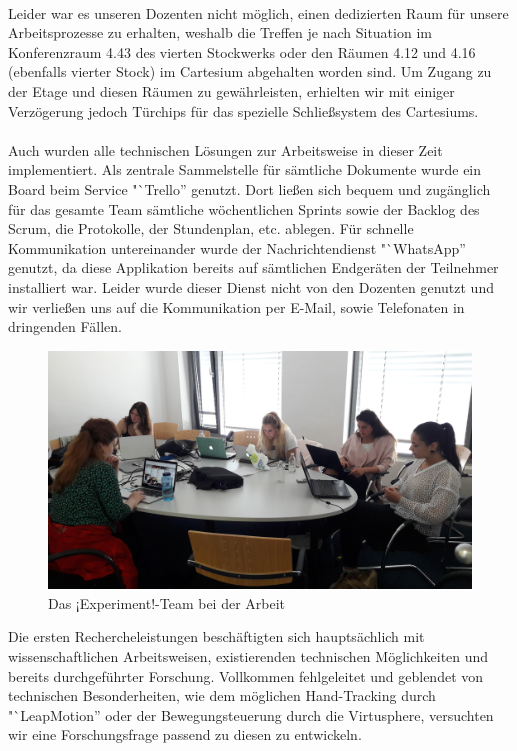 \documentclass{Bericht}
\begin{document}
\\
		Leider war es unseren Dozenten nicht möglich, einen dedizierten Raum für unsere Arbeitsprozesse zu erhalten, weshalb die Treffen je nach Situation im Konferenzraum 4.43 des vierten Stockwerks oder den Räumen 4.12 und 4.16 (ebenfalls vierter Stock) im Cartesium abgehalten worden sind. Um Zugang zu der Etage und diesen Räumen zu gewährleisten, erhielten wir mit einiger Verzögerung jedoch Türchips für das spezielle Schließsystem des Cartesiums.\\
\\
\newpage
		Auch wurden alle technischen Lösungen zur Arbeitsweise in dieser Zeit implementiert. Als zentrale Sammelstelle für sämtliche Dokumente wurde ein Board beim Service "`Trello'' genutzt. Dort ließen sich bequem und zugänglich für das gesamte Team sämtliche wöchentlichen Sprints sowie der Backlog des Scrum, die Protokolle, der Stundenplan, etc. ablegen. Für schnelle Kommunikation untereinander wurde der Nachrichtendienst "`WhatsApp'' genutzt, da diese Applikation bereits auf sämtlichen Endgeräten der Teilnehmer installiert war. Leider wurde dieser Dienst nicht von den Dozenten genutzt und wir verließen uns auf die Kommunikation per E-Mail, sowie Telefonaten in dringenden Fällen.\\
		\begin{figure}[H] %
			\centering
			\includegraphics[width=\linewidth, height=\textheight, keepaspectratio]{../Bilder/20170518_103125.jpg}
			\caption{Das ¡Experiment!-Team bei der Arbeit}
			\label{img:experiment-team-bei-der-arbeit}
		\end{figure}
		Die ersten Rechercheleistungen beschäftigten sich hauptsächlich mit wissenschaftlichen Arbeitsweisen, existierenden technischen Möglichkeiten und bereits durchgeführter Forschung. Vollkommen fehlgeleitet und geblendet von technischen Besonderheiten, wie dem möglichen Hand-Tracking durch "`LeapMotion'' oder der Bewegungsteuerung durch die Virtusphere, versuchten wir eine Forschungsfrage passend zu diesen zu entwickeln.\\
\end{document}
